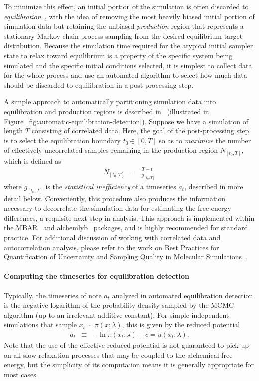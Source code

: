 \documentclass[9pt,bestpractices]{livecoms}
\begin{document}
%
To minimize this effect, an initial portion of the simulation is often discarded to \emph{equilibration}~\cite{braun2019best}, with the idea of removing the most heavily biased initial portion of simulation data but retaining the unbiased \emph{production} region that represents a stationary Markov chain process sampling from the desired equilibrium target distribution.
Because the simulation time required for the atypical initial sampler state to relax toward equilibrium is a property of the specific system being simulated and the specific initial conditions selected, it is simplest to collect data for the whole process and use an automated algorithm to select how much data should be discarded to equilibration in a post-processing step.

A simple approach to automatically partitioning simulation data into equilibration and production regions is described in~\cite{chodera2016simple} (illustrated in Figure~\ref{fig:automatic-equilibration-detection}).
Suppose we have a simulation of length $T$ consisting of correlated data.
Here, the goal of the post-processing step is to select the equilibration boundary $t_0 \in [0, T]$ so as to \emph{maximize} the number of effectively uncorrelated samples remaining in the production region $N_{[t_0,T]}$, which is defined as
\begin{eqnarray}
N_{[t_0,T]} &=& \frac{T - t_0}{g_{[t_0,T]}}
\end{eqnarray}
where $g_{[t_0,T]}$ is the \emph{statistical inefficiency} of a timeseries $a_t$, described in more detail below.
Conveniently, this procedure also produces the information necessary to decorrelate the simulation data for estimating the free energy differences, a requisite next step in analysis.
This approach is implemented within the MBAR~\cite{kylebeauchamp2019choderalab} and alchemlyb~\cite{daviddotson2019alchemistry} packages, and is highly recommended for standard practice.
%
For additional discussion of working with correlated data and autocorrelation analysis, please refer to the work on Best Practices for Quantification of Uncertainty and Sampling Quality in Molecular Simulations~\cite{grossfield2018best}.
%
\paragraph{Computing the timeseries for equilibration detection}
Typically, the timeseries of note $a_t$ analyzed in automated equilibration detection is the negative logarithm of the probability density sampled by the MCMC algorithm (up to an irrelevant additive constant).
For simple independent simulations that sample $x_t \sim \pi(x ; \lambda)$, this is given by the reduced potential
\begin{eqnarray}
a_t &\equiv& - \ln \pi(x_t; \lambda) + c = u(x_t; \lambda) .
\end{eqnarray}
%
Note that the use of the effective reduced potential is not guaranteed to pick up on all slow relaxation processes that may be coupled to the alchemical free energy, but the simplicity of its computation means it is generally appropriate for most cases.
%
\end{document}
